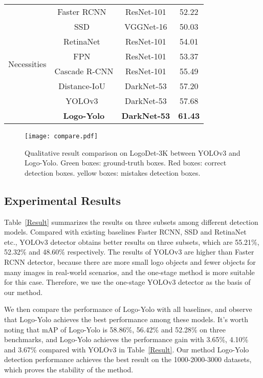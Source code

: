 \documentclass[journal]{IEEEtran}
\begin{document}
\begin{table}[!t]
{\begin{tabular}{cccc}
			\multirow{8}{*}{Necessities} & Faster RCNN~\cite{Ren2015}                & ResNet-101        &52.22        \\
			& SSD~\cite{liu2016ssd}                & VGGNet-16          &50.03         \\
			& RetinaNet~\cite{Tsung2017Focal}      & ResNet-101         &54.01             \\
			& FPN~\cite{Lin2017FPN}                                  & ResNet-101         &53.37             \\
			& Cascade R-CNN\cite{Cai2018CascadeR-CNN}                        & ResNet-101         &55.49            \\ 
			& Distance-IoU~\cite{Zheng2020Distance}                         & DarkNet-53         &57.20     \\                                            
			& YOLOv3~\cite{Joseph2018Yolov3}       & DarkNet-53         &57.68             \\
			& \textbf{Logo-Yolo}                   & \textbf{DarkNet-53}         & \textbf{61.43}   \\ \hline
	\end{tabular}}
\end{table}

\begin{figure*}[!t]
	\centering
	\texttt{[image: compare.pdf]}
	\caption{Qualitative result comparison on LogoDet-3K between YOLOv3 and Logo-Yolo. Green boxes:  ground-truth boxes. Red boxes: correct detection boxes. yellow boxes: mistakes detection boxes.}
	\label{compare}
\end{figure*}
\subsection{Experimental Results}
Table~\ref{Result} summarizes the results on three subsets among different detection models. Compared with existing baselines Faster RCNN, SSD and RetinaNet etc., YOLOv3 detector obtains better results on three subsets, which are 55.21\%, 52.32\% and 48.60\% respectively. The results of YOLOv3 are higher than Faster RCNN detector, because there are more small logo objects and fewer objects for many images in real-world scenarios, and the one-stage method is more suitable for this case. Therefore, we use the one-stage YOLOv3 detector as the basis of our method.

We then compare the performance of Logo-Yolo with all baselines, and observe that Logo-Yolo achieves the best performance among these models. It's worth noting that mAP of Logo-Yolo is 58.86\%, 56.42\% and 52.28\% on three benchmarks, and Logo-Yolo achieves the performance gain with 3.65\%, 4.10\% and 3.67\% compared with YOLOv3 in Table~\ref{Result}. Our method Logo-Yolo detection performance achieves the best result on the 1000-2000-3000 datasets, which proves the stability of the method.
\end{document}
